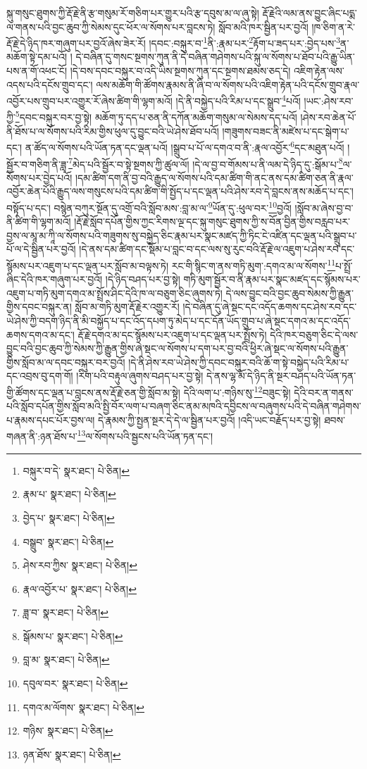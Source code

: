 སྐུ་གསུང་ཐུགས་ཀྱི་རྡོ་རྗེ་ནི་རྩ་གསུམ་རོ་གཅིག་པར་གྱུར་པའི་རྩ་དབུས་མ་ལ་ཞུ་སྟེ། རྡོ་རྗེའི་ལམ་ནས་བྱུང་ཞིང་པདྨ་ལ་གནས་པའི་བྱང་ཆུབ་ཀྱི་སེམས་དུང་ཕོར་ལ་སོགས་པར་བླངས་ཏེ། སློབ་མའི་ཁར་སྦྱིན་པར་བྱའོ། །ཁ་ཅིག་ན་རེ་རྡོ་རྗེ་དེ་ཉིད་ཁར་གཞུག་པར་བྱའོ་ཞེས་ཟེར་རོ། །དབང་:བསྐུར་བ་\footnote{བསྐུར་བ་དེ་  སྣར་ཐང་།  པེ་ཅིན། }ནི་:རྣམ་པར་\footnote{རྣམ་པ་  སྣར་ཐང་།  པེ་ཅིན། }རྟོག་པ་ཟད་པར་:བྱེད་པས་\footnote{བྱེད་པ་  སྣར་ཐང་།  པེ་ཅིན། }ན་མཆོག་སྟེ་དམ་པའོ། །
དེ་བཞིན་དུ་གསང་སྔགས་ཀུན་ནི་དེ་བཞིན་གཤེགས་པའི་སྐུ་ལ་སོགས་པ་ཐོབ་པའི་རྒྱུ་ཡིན་པས་ན་གོ་འཕང་ངོ། །དེ་བས་དབང་བསྐུར་བ་འདི་ཡིས་སྔགས་ཀུན་དང་སྔགས་ཐམས་ཅད་དེ། འཇིག་རྟེན་ལས་འདས་པའི་དངོས་གྲུབ་དང་། ལས་མཆོག་གི་ཚོགས་རྣམས་ནི་ཞི་བ་ལ་སོགས་པའི་འཇིག་རྟེན་པའི་དངོས་གྲུབ་རྣལ་འབྱོར་པས་གྲུབ་པར་འགྱུར་རོ་ཞེས་ཚིག་གི་ལྷག་མའོ། །དེ་ནི་བསྐྱེད་པའི་རིམ་པ་དང་སྒྲུབ་\footnote{བསྒྲུབ་  སྣར་ཐང་།  པེ་ཅིན། }པའོ། །ཡང་:ཤེས་རབ་ཀྱི་\footnote{ཤེས་རབ་ཀྱིས་  སྣར་ཐང་།  པེ་ཅིན། }དབང་བསྐུར་བར་བྱ་སྟེ། མཆོག་ཏུ་དད་པ་ཅན་ནི་དཀོན་མཆོག་གསུམ་ལ་སེམས་དད་པའོ། །ཤེས་རབ་ཆེན་པོ་ནི་ཐོས་པ་ལ་སོགས་པའི་རིམ་གྱིས་ཕུལ་དུ་བྱུང་བའི་ཡེ་ཤེས་ཐོབ་པའོ། །གཟུགས་བཟང་ནི་མཛེས་པ་དང་སྒེག་པ་དང་། ན་ཚོད་ལ་སོགས་པའི་ཡོན་ཏན་དང་ལྡན་པའོ། །སྒྲུབ་པ་པོ་ལ་དགའ་བ་ནི་:རྣལ་འབྱོར་\footnote{རྣལ་འབྱོར་པ་  སྣར་ཐང་།  པེ་ཅིན། }དང་མཐུན་པའོ། །སྦྱོར་བ་གཅིག་ནི་ཟླ་\footnote{ཟླ་བ་  སྣར་ཐང་།  པེ་ཅིན། }མེད་པའི་སྦྱོར་བ་སྟེ་སྔགས་ཀྱི་ཚུལ་ལོ། །དེ་ལ་བྱ་བ་གོམས་པ་ནི་ལམ་དེ་ཉིད་དུ་:སྒོམ་པ་\footnote{སྒོམས་པ་  སྣར་ཐང་།  པེ་ཅིན། }ལ་སོགས་པར་བྱེད་པའོ། །དམ་ཚིག་དག་ནི་བྱ་བའི་རྒྱུད་ལ་སོགས་པའི་དམ་ཚིག་གི་ནང་ནས་དམ་ཚིག་ཅན་ནི་རྣལ་འབྱོར་ཆེན་པོའི་རྒྱུད་ལས་གསུངས་པའི་དམ་ཚིག་གི་སྤྱོད་པ་དང་ལྡན་པའི་ཤེས་རབ་དེ་བླངས་ནས་མཆོད་པ་དང་། བསྟོད་པ་དང་། བསྙེན་བཀུར་སྔོན་དུ་འགྲོ་བའི་སློབ་མས་:བླ་མ་ལ་\footnote{བླ་མ་  སྣར་ཐང་།  པེ་ཅིན། }ཡོན་དུ་:ཕུལ་བར་\footnote{དབུལ་བར་  སྣར་ཐང་།  པེ་ཅིན། }བྱའོ། །སློབ་མ་ཞེས་བྱ་བ་ནི་ཚིག་གི་ལྷག་མའོ། །རྡོ་རྗེ་སློབ་དཔོན་གྱིས་ཀྱང་རིགས་ལྔ་དང་སྐུ་གསུང་ཐུགས་ཀྱི་ས་བོན་བྱིན་གྱིས་བརླབ་པར་བྱས་ལ་མཱ་མ་ཀཱི་ལ་སོགས་པའི་གཟུགས་སུ་བསྐྱེད་ཅིང་རྣམ་པར་སྣང་མཛད་ཀྱི་ཏིང་ངེ་འཛིན་དང་ལྡན་པའི་སྒྲུབ་པ་པོ་ལ་དེ་སྦྱིན་པར་བྱའོ། །དེ་ནས་དམ་ཚིག་དང་སྡོམ་པ་བླང་བ་དང་ལས་སུ་རུང་བའི་རྡོ་རྗེ་ལ་འཇུག་པ་ཤེས་རབ་དང་སྙོམས་པར་འཇུག་པ་དང་ལྡན་པར་སློབ་མ་བལྟས་ཏེ། རང་གི་སྙིང་ག་ནས་གཏི་མུག་:དགའ་མ་ལ་སོགས་\footnote{དགའ་མ་ལོགས་  སྣར་ཐང་།  པེ་ཅིན། }པ་སྤྲོ་ཞིང་དེའི་ཁར་གཞུག་པར་བྱའོ། །དེ་ཉིད་བཤད་པར་བྱ་སྟེ། གཏི་མུག་སྦྱོར་བ་ནི་རྣམ་པར་སྣང་མཛད་དང་སྙོམས་པར་འཇུག་པ་གཏི་མུག་དགའ་མ་སྤྲོས་ཤིང་དེའི་ཁ་ལ་བཅུག་ཅིང་ཞུགས་ཏེ། དེ་ལས་བྱུང་བའི་བྱང་ཆུབ་སེམས་ཀྱི་རྒྱུན་གྱིས་དབང་བསྐུར་ན། སློབ་མ་གཏི་མུག་རྡོ་རྗེར་འགྱུར་རོ། །དེ་བཞིན་དུ་ཞེ་སྡང་དང་འདོད་ཆགས་དང་ཤེས་རབ་དང་ཡེ་ཤེས་ཀྱི་བདག་ཉིད་ནི་མི་བསྐྱོད་པ་དང་འོད་དཔག་ཏུ་མེད་པ་དང་དོན་ཡོད་གྲུབ་པ་ཞེ་སྡང་དགའ་མ་དང་འདོད་ཆགས་དགའ་མ་དང་། རྡོ་རྗེ་དགའ་མ་དང་སྙོམས་པར་འཇུག་པ་དང་ལྡན་པར་སྤྲོས་ཏེ། དེའི་ཁར་བཅུག་ཅིང་དེ་ལས་བྱུང་བའི་བྱང་ཆུབ་ཀྱི་སེམས་ཀྱི་རྒྱུན་གྱིས་ཞེ་སྡང་ལ་སོགས་པ་དག་པར་བྱ་བའི་ཕྱིར་ཞེ་སྡང་ལ་སོགས་པའི་རྒྱུན་གྱིས་སློབ་མ་ལ་དབང་བསྐུར་བར་བྱའོ། །དེ་ནི་ཤེས་རབ་ཡེ་ཤེས་ཀྱི་དབང་བསྐུར་བའི་ཆོ་ག་སྟེ་བསྐྱེད་པའི་རིམ་པ་དང་འབྲས་བུ་དག་གོ། །རིག་པའི་བརྟུལ་ཞུགས་བཤད་པར་བྱ་སྟེ། དེ་ནས་ལྷ་མོ་དེ་ཉིད་ནི་སྔར་བཤད་པའི་ཡོན་ཏན་གྱི་ཚོགས་དང་ལྡན་པ་བླངས་ནས་རྡོ་རྗེ་ཅན་གྱི་སློབ་མ་སྟེ། དེའི་ལག་པ་:གཉིས་སུ་\footnote{གཉིས་  སྣར་ཐང་།  པེ་ཅིན། }བཟུང་སྟེ། དེའི་བར་ན་གནས་པའི་སློབ་དཔོན་གྱིས་སློབ་མའི་སྤྱི་བོར་ལག་པ་བཞག་ཅིང་ནམ་མཁའི་དབྱིངས་ལ་བཞུགས་པའི་དེ་བཞིན་གཤེགས་པ་རྣམས་དཔང་པོར་བྱས་ལ། དེ་རྣམས་ཀྱི་སྤྱན་སྔར་དེ་དེ་ལ་སྦྱིན་པར་བྱའོ། །འདི་ཡང་བརྗོད་པར་བྱ་སྟེ། ཐབས་གཞན་ནི་:ཉན་ཐོས་པ་\footnote{ཉན་ཐོས་  སྣར་ཐང་།  པེ་ཅིན། }ལ་སོགས་པའི་སྦྱངས་པའི་ཡོན་ཏན་དང་། 
